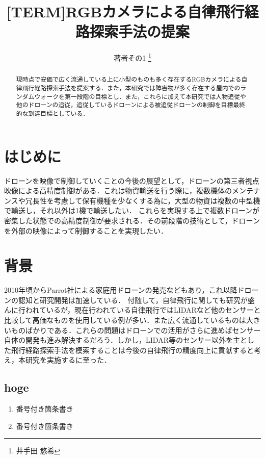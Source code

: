 \documentclass[a4j,10pt]{jsarticle}
\begin{document}

\title{[TERM]RGBカメラによる自律飛行経路探索手法の提案}

\author{
    著者その1 \thanks{井手田 悠希}
}

\begin{abstract}
現時点で安価で広く流通している上に小型のものも多く存在するRGBカメラによる自律飛行経路探索手法を提案する．また，本研究では障害物が多く存在する屋内でのランダムウォークを第一段階の目標とし．また，これらに加えて本研究では人物追従や他のドローンの追従，追従しているドローンによる被追従ドローンの制御を目標最終的な到達目標としている．
\end{abstract}

\maketitle
\thispagestyle{empty}

\section{はじめに}
ドローンを映像で制御していくことの今後の展望として，ドローンの第三者視点映像による高精度制御がある．これは物資輸送を行う際に，複数機体のメンテナンスや冗長性を考慮して保有機種を少なくする為に，大型の物資は複数の中型機で輸送し，それ以外は1機で輸送したい．
これらを実現する上で複数ドローンが密集した状態での高精度制御が要求される．その前段階の技術として，ドローンを外部の映像によって制御することを実現したい．

\section{背景}
2010年頃からParrot社による家庭用ドローンの発売などもあり，これ以降ドローンの認知と研究開発は加速している．
付随して，自律飛行に関しても研究が盛んに行われているが，現在行われている自律飛行ではLIDARなど他のセンサーと比較して高価なものを使用している例が多い．また広く流通しているものは大きいものばかりである．これらの問題はドローンでの活用がさらに進めばセンサー自体の開発も進み解決するだろう．しかし，LIDAR等のセンサー以外を主とした飛行経路探索手法を模索することは今後の自律飛行の精度向上に貢献すると考え，本研究を実施するに至った．

\subsection{hoge}

\begin{enumerate}
\item 番号付き箇条書き 
\item 番号付き箇条書き
\end{enumerate}
\end{document}
